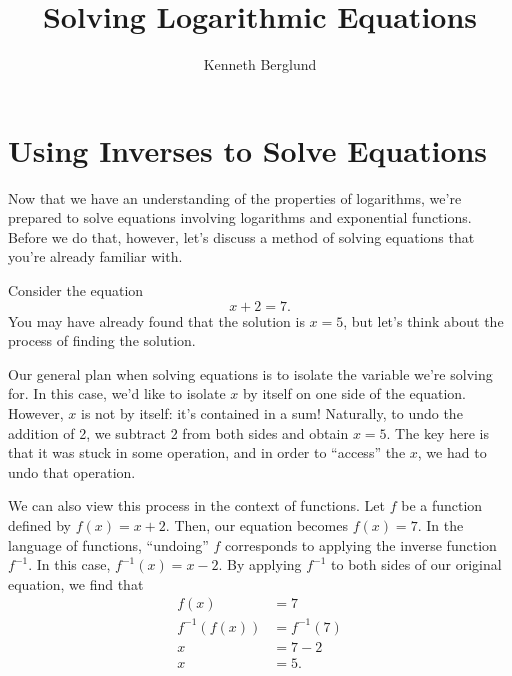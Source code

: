 \documentclass[nooutcomes]{ximera}
\author{Kenneth Berglund}
\title{Solving Logarithmic Equations}
\begin{document}
\begin{abstract}
  
\end{abstract}
\maketitle




\section{Using Inverses to Solve Equations}
Now that we have an understanding of the properties of logarithms, we're prepared to solve equations involving logarithms and exponential functions. Before we do that, however, let's discuss a method of solving equations that you're already familiar with. 

Consider the equation $$x + 2 = 7.$$ You may have already found that the solution is $x = 5$, but let's think about the process of finding the solution. 

Our general plan when solving equations is to isolate the variable we're solving for. In this case, we'd like to isolate $x$ by itself on one side of the equation. However, $x$ is not by itself: it's contained in a sum! Naturally, to undo the addition of 2, we subtract 2 from both sides and obtain $x = 5$. The key here is that it was stuck in some operation, and in order to ``access'' the $x$, we had to undo that operation. 

We can also view this process in the context of functions. Let $f$ be a function defined by $f(x) = x + 2$. Then, our equation becomes $f(x) = 7$. In the language of functions, ``undoing'' $f$ corresponds to applying the inverse function $f^{-1}$. In this case, $f^{-1}(x) = x - 2$. By applying $f^{-1}$ to both sides of our original equation, we find that 
\begin{align*}
f(x) & = 7 \\
f^{-1}(f(x)) & = f^{-1}(7) \\
x &= 7 - 2 \\
x & = 5.
\end{align*}
\end{document}
